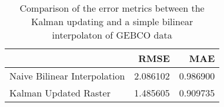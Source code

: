 \begin{table}[h!]
\caption{Comparison of the error metrics between the Kalman updating and a simple bilinear interpolaton of GEBCO data}
\label{raster_rmse_comparison}
\begin{tabular}{lrr}
\toprule
 & RMSE & MAE \\
\midrule
Naive Bilinear Interpolation & 2.086102 & 0.986900 \\
Kalman Updated Raster & 1.485605 & 0.909735 \\
\bottomrule
\end{tabular}
\end{table}
